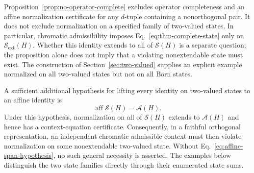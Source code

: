 \documentclass[aps,pra,reprint,superscriptaddress,longbibliography,nofootinbib,floatfix,10pt]{revtex4-2}
\theoremstyle{definition}\newtheorem{definition}[theorem]{Definition}
\theoremstyle{remark}\newtheorem{remark}[theorem]{Remark}
\newcommand{\Sc}{\mathcal S}\newcommand{\Cc}{\mathcal C}\newcommand{\Wc}{\mathcal W}
\begin{document}
Proposition~\ref{prop:no-operator-complete} excludes operator completeness and an affine normalization certificate for any $d$-tuple containing a nonorthogonal pair. It does not exclude normalization on a specified family of two-valued states. In particular, chromatic admissibility imposes Eq.~\eqref{eq:thm-complete-state} only on $\Sc_{\mathrm{ext}}(H)$. Whether this identity extends to all of $\Sc(H)$ is a separate question; the proposition alone does not imply that a violating nonextendable state must exist. The construction of Section~\ref{sec:two-valued} supplies an explicit example normalized on all two-valued states but not on all Born states.

A sufficient additional hypothesis for lifting every identity on two-valued states to an affine identity is
\begin{equation}\label{eq:affine-span-hypothesis}
\operatorname{aff}\Sc(H)=\mathcal A(H).
\end{equation}
Under this hypothesis, normalization on all of $\Sc(H)$ extends to $\mathcal A(H)$ and hence has a context-equation certificate. Consequently, in a faithful orthogonal representation, an independent chromatic admissible context must then violate normalization on some nonextendable two-valued state. Without Eq.~\eqref{eq:affine-span-hypothesis}, no such general necessity is asserted. The examples below distinguish the two state families directly through their enumerated state sums.
\end{document}
